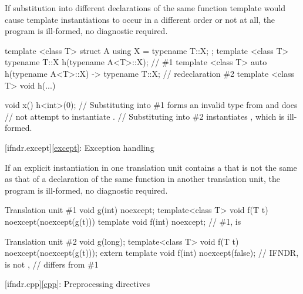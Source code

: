 
\pnum
If substitution
into different declarations
of the same function template
would cause template instantiations to occur
in a different order or not at all,
the program is ill-formed, no diagnostic required.

\pnum
\begin{example}
\begin{codeblock}
template <class T> struct A { using X = typename T::X; };
template <class T> typename T::X h(typename A<T>::X);           // \#1
template <class T> auto h(typename A<T>::X) -> typename T::X;   // redeclaration \#2
template <class T> void h(...) { }

void x() {
  h<int>(0);    // Substituting into \#1 forms an invalid type from  and does
                // not attempt to instantiate .
                // Substituting into \#2 instantiates , which is ill-formed.
}
\end{codeblock}
\end{example}

[ifndr.except]{\ref*{except}: Exception handling}


\pnum
If an explicit instantiation in one translation unit
contains a 
that is not the same as
that of a declaration of the same function
in another translation unit,
the program is ill-formed, no diagnostic required.

\pnum
\begin{example}
\begin{codeblocktu}{Translation unit \#1}
void g(int) noexcept;
template<class T> void f(T t) noexcept(noexcept(g(t))) {}
template void f(int) noexcept;                  // \#1,  is 
\end{codeblocktu}
\begin{codeblocktu}{Translation unit \#2}
void g(long);
template<class T> void f(T t) noexcept(noexcept(g(t)));
extern template void f(int) noexcept(false);    // IFNDR,  is not ,
                                                // differs from \#1
\end{codeblocktu}
\end{example}

[ifndr.cpp]{\ref*{cpp}: Preprocessing directives}


